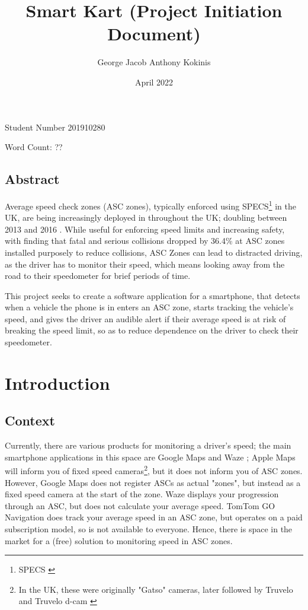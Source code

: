 \documentclass[11pt, a4paper, notitlepage]{report}
\title{Smart Kart (Project Initiation Document)}
\date{April 2022}
\author{George Jacob Anthony Kokinis}
\begin{document}
\maketitle
\begin{center}
    Student Number 201910280
    
    Word Count: ?? %
\end{center}
\newpage
\section{Abstract}
Average speed check zones (ASC zones), typically enforced using SPECS\footnote{SPECS \citep{specsjenop}} in the UK, are being increasingly deployed in throughout the UK; doubling between 2013 and 2016 \citep{BBCSpeedCameraDoubled}. While useful for enforcing speed limits and increasing safety, with \citet{owenAllsop} finding that fatal and serious collisions dropped by 36.4\% at ASC zones installed purposely to reduce collisions, ASC Zones can lead to distracted driving, as the driver has to monitor their speed, which means looking away from the road to their speedometer for brief periods of time.

This project seeks to create a software application for a smartphone, that detects when a vehicle the phone is in enters an ASC zone, starts tracking the vehicle's speed, and gives the driver an audible alert if their average speed is at risk of breaking the speed limit, so as to reduce dependence on the driver to check their speedometer.

\tableofcontents

\chapter{Introduction}
\section{Context}
Currently, there are various products for monitoring a driver's speed; the main smartphone applications in this space are Google Maps \citep{googleMaps} and Waze \citep{waze}; Apple Maps \citep{appleMaps} will inform you of fixed speed cameras\footnote{In the UK, these were originally "Gatso" cameras, later followed by Truvelo and Truvelo d-cam \citep{dcam}}, but it does not inform you of ASC zones. However, Google Maps does not register ASCs as actual "zones", but instead as a fixed speed camera at the start of the zone. Waze displays your progression through an ASC, but does not calculate your average speed. TomTom GO Navigation \citep{tomtomGo} does track your average speed in an ASC zone, but operates on a paid subscription model, so is not available to everyone. Hence, there is space in the market for a (free) solution to monitoring speed in ASC zones.


\end{document}
